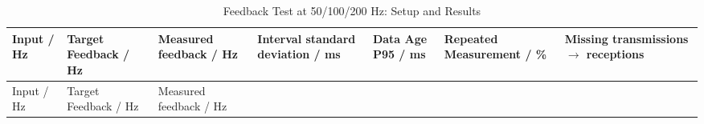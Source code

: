 \FloatBarrier\begingroup\small\setlength{\tabcolsep}{2.5pt}
\begin{longtable}[]{@{}
  >{\raggedright\arraybackslash}p{}
  >{\raggedright\arraybackslash}p{}
  >{\raggedright\arraybackslash}p{}
  >{\raggedright\arraybackslash}p{}
  >{\raggedright\arraybackslash}p{}
  >{\raggedright\arraybackslash}p{}
  >{\raggedright\arraybackslash}p{}@{}}
\caption{Feedback Test at 50/100/200 Hz: Setup and Results}\label{tab:s08-1}\tabularnewline
\toprule\noalign{}
\begin{minipage}[b]{\linewidth}\raggedright
Input / Hz
\end{minipage} & \begin{minipage}[b]{\linewidth}\raggedright
Target Feedback / Hz
\end{minipage} & \begin{minipage}[b]{\linewidth}\raggedright
Measured feedback / Hz
\end{minipage} & \begin{minipage}[b]{\linewidth}\raggedright
Interval standard de\-vi\-a\-tion / ms
\end{minipage} & \begin{minipage}[b]{\linewidth}\raggedright
Data Age P95 / ms
\end{minipage} & \begin{minipage}[b]{\linewidth}\raggedright
Repeated Measurement / \%
\end{minipage} & \begin{minipage}[b]{\linewidth}\raggedright
Missing transmissions \(\rightarrow\) receptions
\end{minipage} \\
\midrule\noalign{}
\endfirsthead
\toprule\noalign{}
\begin{minipage}[b]{\linewidth}\raggedright
Input / Hz
\end{minipage} & \begin{minipage}[b]{\linewidth}\raggedright
Target Feedback / Hz
\end{minipage} & \begin{minipage}[b]{\linewidth}\raggedright
Measured feedback / Hz
\end{minipage} & \begin{minipage}[b]{\linewidth}\raggedright

\end{minipage}
\end{longtable}
